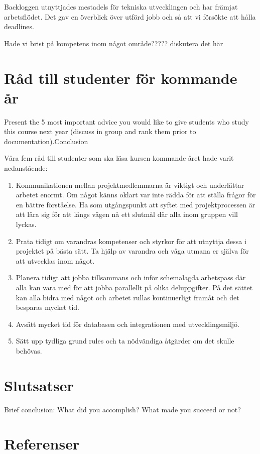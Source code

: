 \documentclass[12pt]{article}
\begin{document}
Backloggen utnyttjades mestadels för tekniska utvecklingen och har främjat arbetsflödet. Det gav en överblick över utförd jobb och så att vi försökte att hålla deadlines. 

Hade vi brist på kompetens inom något område????? diskutera det här


\section{Råd till studenter för kommande år}
Present the 5 most important advice you would like to give students who study this course next year (discuss in group and rank them prior to documentation).Conclusion

Våra fem råd till studenter som ska läsa kursen kommande året hade varit nedanstående:
\begin{enumerate}

\item  Kommunikationen mellan projektmedlemmarna är viktigt och underlättar arbetet enormt. Om något känns oklart var inte rädda för att ställa frågor för en bättre förståelse. Ha som utgångspunkt att syftet med projektprocessen är att lära sig för att längs vägen nå ett slutmål där alla inom gruppen vill lyckas.
\item Prata tidigt om varandras kompetenser och styrkor för att utnyttja dessa i projektet på bästa sätt. Ta hjälp av varandra och våga utmana er själva för att utvecklas inom något. 
\item  Planera tidigt att jobba tillsammans och inför schemalagda arbetspass där alla kan vara med för att jobba parallellt på olika deluppgifter. På det sättet kan alla bidra med något och arbetet rullas kontinuerligt framåt och det besparas mycket tid. 
\item  Avsätt mycket tid för databasen och integrationen med utvecklingsmiljö. 
\item  Sätt upp tydliga grund rules och ta nödvändiga åtgärder om det skulle behövas.        
\end{enumerate}

\section{Slutsatser}
Brief conclusion: What did you accomplish? What made you succeed or not? 

\section{Referenser}






\end{document}
